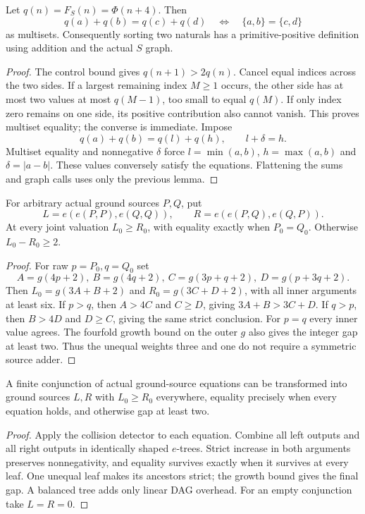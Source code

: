 \documentclass[11pt,a4paper]{article}
\begin{document}
\begin{lemma}\label{lem:sort}
Let $q(n)=F_S(n)=\Phi(n+4)$.  Then
\[
 q(a)+q(b)=q(c)+q(d)
 \quad\Longleftrightarrow\quad\{a,b\}=\{c,d\}
\]
as multisets.  Consequently sorting two naturals has a primitive-positive
definition using addition and the actual $S$ graph.
\end{lemma}
\begin{proof}
The control bound gives $q(n+1)>2q(n)$.  Cancel equal indices across the
two sides.  If a largest remaining index $M\ge1$ occurs, the other side
has at most two values at most $q(M-1)$, too small to equal $q(M)$.
If only index zero remains on one side, its positive contribution also
cannot vanish.  This proves multiset equality; the converse is immediate.
Impose
\[
 q(a)+q(b)=q(l)+q(h),\qquad l+\delta=h.
\]
Multiset equality and nonnegative $\delta$ force $l=\min(a,b)$,
$h=\max(a,b)$ and $\delta=|a-b|$.  These values conversely satisfy the
equations.  Flattening the sums and graph calls uses only the previous lemma.
\end{proof}

\begin{lemma}\label{lem:collision}
For arbitrary actual ground sources $P,Q$, put
\[
 L=e(e(P,P),e(Q,Q)),\qquad R=e(e(P,Q),e(Q,P)).
\]
At every joint valuation $L_0\ge R_0$, with equality exactly when
$P_0=Q_0$.  Otherwise $L_0-R_0\ge2$.
\end{lemma}
\begin{proof}
For raw $p=P_0,q=Q_0$ set
\[
 A=g(4p+2),\ B=g(4q+2),\ C=g(3p+q+2),\ D=g(p+3q+2).
\]
Then $L_0=g(3A+B+2)$ and $R_0=g(3C+D+2)$, with all inner arguments
at least six.  If $p>q$, then $A>4C$ and $C\ge D$, giving
$3A+B>3C+D$.  If $q>p$, then $B>4D$ and $D\ge C$, giving the same
strict conclusion.  For $p=q$ every inner value agrees.  The fourfold
growth bound on the outer $g$ also gives the integer gap at least two.
Thus the unequal weights three and one do not require a symmetric source adder.
\end{proof}

\begin{lemma}\label{lem:aggregate}
A finite conjunction of actual ground-source equations can be transformed
into ground sources $L,R$ with $L_0\ge R_0$ everywhere, equality precisely
when every equation holds, and otherwise gap at least two.
\end{lemma}
\begin{proof}
Apply the collision detector to each equation.  Combine all left outputs
and all right outputs in identically shaped $e$-trees.  Strict increase
in both arguments preserves nonnegativity, and equality survives exactly
when it survives at every leaf.  One unequal leaf makes its ancestors
strict; the growth bound gives the final gap.  A balanced tree adds only
linear DAG overhead.  For an empty conjunction take $L=R=0$.
\end{proof}
\end{document}
